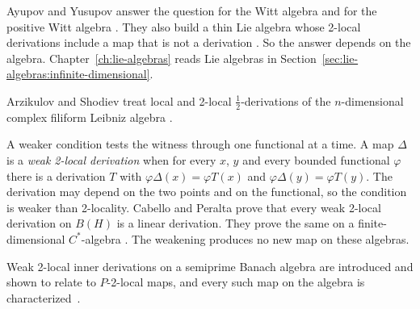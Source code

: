 Ayupov and Yusupov answer the question for the Witt algebra and for the
positive Witt algebra \cite[Theorem~4.1, p.~4; Theorem~4.4, p.~6]{AyupovYusupov2020}.
They also build a thin Lie algebra whose 2-local derivations include a map that
is not a derivation \cite[Theorem~4.8, p.~8]{AyupovYusupov2020}. So the answer
depends on the algebra. Chapter~\ref{ch:lie-algebras} reads Lie algebras in
Section~\ref{sec:lie-algebras:infinite-dimensional}.

Arzikulov and Shodiev treat local and 2-local $\frac12$-derivations of the
$n$-dimensional complex filiform Leibniz algebra
\cite[Abstract, p.~1]{ArzikulovShodiev2026}.

A weaker condition tests the witness through one functional at a time. A map
$\Delta$ is a \emph{weak 2-local derivation} \cite[p.~382]{CabelloPeralta2017Weak}
when for every $x$, $y$ and every bounded functional $\varphi$ there is a
derivation $T$ with $\varphi\Delta(x)=\varphi T(x)$ and
$\varphi\Delta(y)=\varphi T(y)$. The derivation may depend on the two
points and on the functional, so the condition is weaker than 2-locality.
Cabello and Peralta prove that every weak 2-local derivation on $B(H)$ is a
linear derivation. They prove the same on a finite-dimensional
$C^{\ast}$-algebra \cite[Theorems~1.1 and~1.2, p.~383]{CabelloPeralta2017Weak}. The weakening
produces no new map on these algebras.

Weak 2-local inner derivations on a semiprime Banach algebra are introduced and shown to relate to $P$-2-local maps, and every such map on the algebra is characterized~\cite{WlWeak2LocalInnerDerivationsOfSe2020}.
